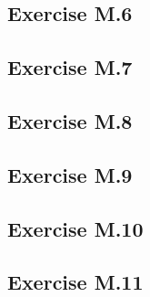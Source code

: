 \documentclass{article}
\begin{document}
\subsection*{Exercise M.6}
\subsection*{Exercise M.7}
\subsection*{Exercise M.8}
\subsection*{Exercise M.9}
\subsection*{Exercise M.10}
\subsection*{Exercise M.11}
\end{document}
